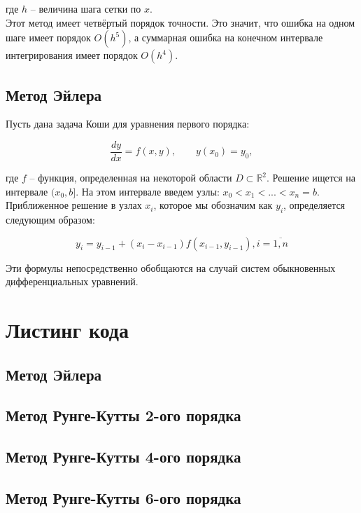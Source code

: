 \documentclass[a4paper,12pt]{extarticle}
\begin{document}
    \noindent
    где $h$ -- величина шага сетки по $x$. \\
    Этот метод имеет четвёртый порядок точности. Это значит, что ошибка на одном шаге имеет порядок $O(h^5)$, а суммарная ошибка на конечном интервале интегрирования имеет порядок $O(h^4)$.

    \subsection{Метод Эйлера}
    Пусть дана задача Коши для уравнения первого порядка:

    \[
        \dfrac{dy}{dx} = f(x, y), \qquad y(x_0) = y_0,
    \]

    \noindent
    где $f$ -- функция, определенная на некоторой области $D \subset \mathbb{R}^2$. Решение ищется на интервале $(x_0, b]$. На этом интервале введем узлы: $x_0 < x_1 < ... < x_n = b$. Приближенное решение в узлах $x_i$, которое мы обозначим как $y_i$, определяется следующим образом:

    \[
        y_i = y_{i-1} + (x_i - x_{i-1})f(x_{i-1}, y_{i-1}), i = \overline{1,n}
    \]

    \noindent
    Эти формулы непосредственно обобщаются на случай систем обыкновенных дифференциальных уравнений.

    \section{Листинг кода}
    \subsection{Метод Эйлера}

    \subsection{Метод Рунге-Кутты 2-ого порядка}
    \subsection{Метод Рунге-Кутты 4-ого порядка}
    \subsection{Метод Рунге-Кутты 6-ого порядка}
\end{document}
